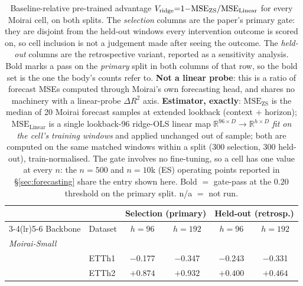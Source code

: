 \begin{table}[t]
\centering
\caption{Baseline-relative pre-trained advantage $V_{\text{ridge}} {=} 1 {-}
\text{MSE}_{\text{ZS}}/\text{MSE}_{\text{Linear}}$ for every Moirai cell, on both
splits. The \emph{selection} columns are the paper's primary gate: they are disjoint from
the held-out windows every intervention outcome is scored on, so cell inclusion is not a
judgement made after seeing the outcome. The \emph{held-out} columns are the retrospective
variant, reported as a sensitivity analysis. Bold marks a pass on the \emph{primary} split
in both columns of that row, so the bold set is the one the body's counts refer to.
\textbf{Not a linear probe}: this is a ratio of forecast MSEs computed through
Moirai's own forecasting head, and shares no machinery with a
linear-probe $\Delta R^2$ axis.
\textbf{Estimator, exactly}: $\text{MSE}_{\text{ZS}}$ is the median of 20
Moirai forecast samples at extended lookback (context $+$ horizon);
$\text{MSE}_{\text{Linear}}$ is a single lookback-96 ridge-OLS linear map
$\mathbb{R}^{96 \times D} {\to} \mathbb{R}^{h \times D}$ \emph{fit on the
cell's training windows} and applied unchanged out of sample; both are computed
on the same matched windows within a split (300 selection, 300
held-out), train-normalised.
The gate involves no fine-tuning, so a cell has one value at every $n$: the
$n{=}500$ and $n{=}10$k (ES) operating points reported in
\S\ref{sec:forecasting} share the entry shown here.
Bold ${=}$ gate-pass at the $0.20$ threshold on the primary split. n/a ${=}$ not run.}
\label{tab:r2task}
\small
\begin{tabular}{ll cc cc}
\toprule
& & \multicolumn{2}{c}{Selection (primary)} & \multicolumn{2}{c}{Held-out (retrosp.)} \\
\cmidrule(lr){3-4}\cmidrule(lr){5-6}
Backbone & Dataset & $h{=}96$ & $h{=}192$ & $h{=}96$ & $h{=}192$ \\
\midrule
\multicolumn{6}{l}{\textit{Moirai-Small}} \\
 & ETTh1                  & $-$0.177 & $-$0.347 & $-$0.243 & $-$0.331 \\
 & ETTh2                  & $\mathbf{+0.874}$ & $\mathbf{+0.932}$ & $\mathbf{+0.400}$ & $\mathbf{+0.464}$ \\

\end{tabular}
\end{table}
